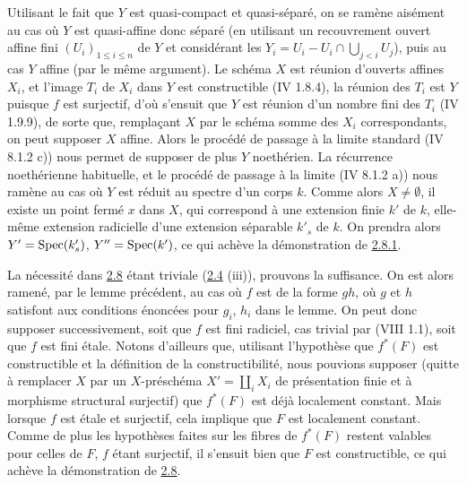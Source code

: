 \documentclass[10pt]{../fichiers-configuration-latex/smfart}
\begin{document}
Utilisant le fait que $Y$ est quasi-compact et quasi-séparé, on se
ramène aisément au cas où $Y$ est quasi-affine donc séparé (en
utilisant un recouvrement ouvert affine fini $(U_i)_{1\leq i\leq n}$
de $Y$ et considérant les $Y_i=U_i-U_i\cap \bigcup_{j< i} U_j$), puis
au cas $Y$ affine (par le même argument). Le schéma $X$ est réunion
d'ouverts affines $X_i$, et l'image $T_i$ de $X_i$ dans $Y$ est
constructible (\EGA IV 1.8.4), la réunion des $T_i$ est $Y$ puisque $f$
est surjectif, d'où s'ensuit que $Y$ est réunion d'un nombre fini des
$T_i$ (\EGA IV 1.9.9), de sorte que, remplaçant $X$ par le schéma
somme des $X_i$ correspondants, on peut supposer $X$ affine. Alors le
procédé de passage à la limite standard (\EGA IV 8.1.2 c)) nous
permet de supposer de plus $Y$ noethérien. La récurrence noethérienne
habituelle, et le procédé de passage à la limite (\EGA IV 8.1.2 a))
nous ramène au cas où $Y$ est réduit au spectre d'un corps $k$. Comme
alors $X\neq ∅$, il existe un point fermé $x$ dans $X$, qui
correspond à une extension finie $k'$ de $k$, elle-même extension
radicielle d'une extension séparable $k'_s$ de $k$. On prendra alors
$Y'=\operatorname{Spec}(k'_s)$, $Y''=\operatorname{Spec}(k')$, ce qui achève la démonstration de
\hyperref[IX.lem2.8.1]{2.8.1}.

La nécessité dans \hyperref[IX.prop2.8]{2.8} étant triviale (\hyperref[IX.prop2.4]{2.4} (iii)), prouvons la
suffisance. On est alors ramené, par le lemme précédent, au cas où $f$
est de la forme $gh$, où $g$ et $h$ satisfont aux conditions énoncées
pour $g_i$, $h_i$ dans le lemme. On peut donc supposer successivement,
soit que $f$ est fini radiciel, cas trivial par (VIII 1.1), soit que
$f$ est fini étale. Notons d'ailleurs que, utilisant l'hypothèse que
$f^{\ast}(F)$ est constructible et la définition de la
constructibilité, nous pouvions supposer (quitte à remplacer $X$ par
un $X$-préschéma $X'=\coprod_i X_i$ de présentation finie et à
morphisme structural surjectif) que $f^{\ast}(F)$ est déjà localement
constant. Mais lorsque $f$ est étale et surjectif, cela implique que
$F$ est localement constant. Comme de plus les hypothèses faites sur
les fibres de $f^{\ast}(F)$ restent valables pour celles de $F$, $f$
étant surjectif, il s'ensuit bien que $F$ est constructible, ce qui
achève la démonstration de \hyperref[IX.prop2.8]{2.8}.
\end{document}
